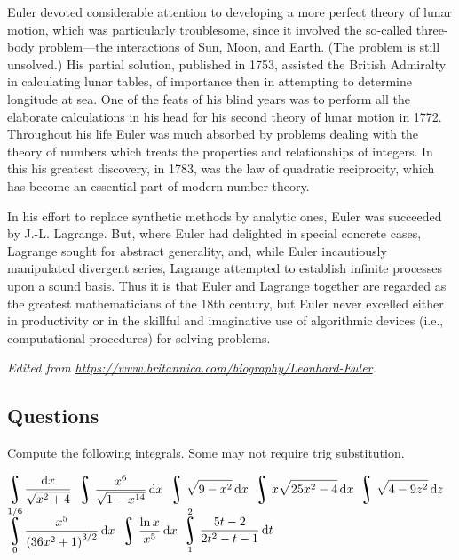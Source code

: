 Euler devoted considerable attention to developing a more perfect theory of lunar motion, which was particularly troublesome, since it involved the so-called three-body problem—the interactions of Sun, Moon, and Earth. (The problem is still unsolved.) His partial solution, published in 1753, assisted the British Admiralty in calculating lunar tables, of importance then in attempting to determine longitude at sea. One of the feats of his blind years was to perform all the elaborate calculations in his head for his second theory of lunar motion in 1772. Throughout his life Euler was much absorbed by problems dealing with the theory of numbers which treats the properties and relationships of integers. In this his greatest discovery, in 1783, was the law of quadratic reciprocity, which has become an essential part of modern number theory.

In his effort to replace synthetic methods by analytic ones, Euler was succeeded by J.-L. Lagrange. But, where Euler had delighted in special concrete cases, Lagrange sought for abstract generality, and, while Euler incautiously manipulated divergent series, Lagrange attempted to establish infinite processes upon a sound basis. Thus it is that Euler and Lagrange together are regarded as the greatest mathematicians of the 18th century, but Euler never excelled either in productivity or in the skillful and imaginative use of algorithmic devices (i.e., computational procedures) for solving problems.

\textit{Edited from \url{https://www.britannica.com/biography/Leonhard-Euler}.}

\subsection*{Questions}
Compute the following integrals. Some may not require trig substitution.
\begin{questions}
  \question $ \displaystyle\rint \frac{\dif{x}}{\sqrt{x^2 + 4}} $
  \question $ \displaystyle\rint \frac{x^6}{\sqrt{1 - x^{14}}} \dif{x} $
  \question $ \displaystyle\rint \sqrt{9 - x^2} \dif{x} $
  \question $ \displaystyle\rint x \sqrt{25x^2 - 4} \dif{x} $
  \question $ \displaystyle\rint \sqrt{4-9z^2} \dif{z} $
  \question $ \displaystyle\rint^{1/6}_0 \frac{x^5}{\left( 36x^2 + 1 \right)^{3/2}} \dif{x} $
  \question $ \displaystyle\rint \frac{\ln x}{x^5} \dif{x} $
  \question $ \displaystyle\rint^2_1 \frac{5t - 2}{2t^2 - t - 1} \dif{t} $
\end{questions}


